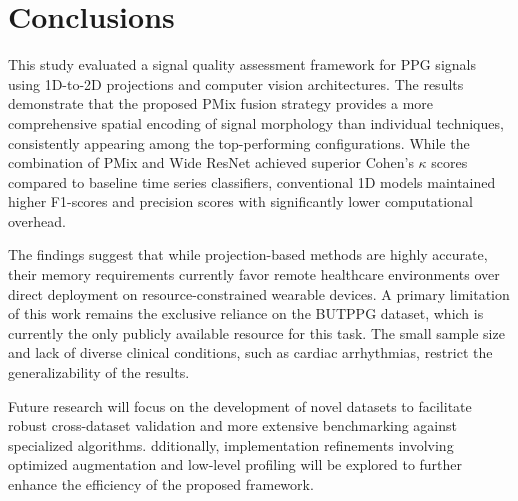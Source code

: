 \documentclass[final,3p,times,twocolumn]{elsarticle}
\begin{document}
\section{Conclusions}
\label{sec:Limitations}



This study evaluated a signal quality assessment framework for \gls{PPG} signals using 1D-to-2D projections and computer vision architectures.
The results demonstrate that the proposed \gls{PMix} fusion strategy provides a more comprehensive spatial encoding of signal morphology than individual techniques, consistently appearing among the top-performing configurations.
While the combination of \gls{PMix} and Wide ResNet achieved superior Cohen's $\kappa$ scores compared to baseline time series classifiers, conventional 1D models maintained higher F1-scores and precision scores with significantly lower computational overhead.

The findings suggest that while projection-based methods are highly accurate, their memory requirements currently favor remote healthcare environments over direct deployment on resource-constrained wearable devices.
A primary limitation of this work remains the exclusive reliance on the \gls{BUTPPG} dataset, which is currently the only publicly available resource for this task.
The small sample size and lack of diverse clinical conditions, such as cardiac arrhythmias, restrict the generalizability of the results.

Future research will focus on the development of novel datasets to facilitate robust cross-dataset validation and more extensive benchmarking against specialized algorithms. 
dditionally, implementation refinements involving optimized augmentation and low-level profiling will be explored to further enhance the efficiency of the proposed framework.



\end{document}
